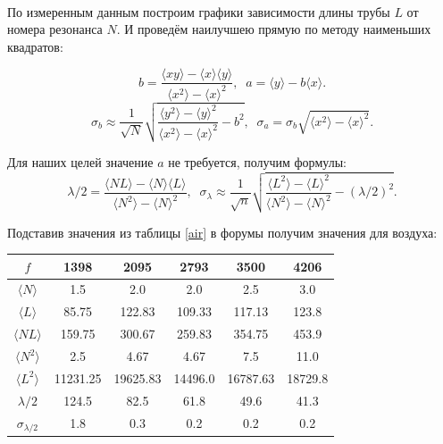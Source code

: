 \documentclass[a4paper,12pt]{article}
\begin{document}
\begin{enumerate}
\begin{enumerate}
\paragraph{} По измеренным данным построим графики зависимости длины трубы $L$ от номера резонанса $N$. И проведём наилучшею прямую по методу наименьших квадратов:

\begin{equation}
b = \frac{\langle xy \rangle - \langle x \rangle \langle y \rangle}{\langle x^2 \rangle - \langle x \rangle ^ 2}, \;\;
a = \langle y \rangle - b \langle x \rangle . \label{lsf}
\end{equation}
\begin{equation}
\sigma_b \approx \frac{1}{\sqrt{N}}\sqrt{\frac{\langle y^2 \rangle - \langle y \rangle ^ 2}{\langle x^2 \rangle - \langle x \rangle ^ 2} - b^2}, \;\;
\sigma_a = \sigma_b \sqrt{\langle x^2 \rangle - \langle x \rangle ^ 2}. \label{lsfvar}
\end{equation}

Для наших целей значение $a$ не требуется, получим формулы:
\begin{equation}
\lambda/2 = \frac{\langle NL \rangle - \langle N \rangle \langle L \rangle}{\langle N^2 \rangle - \langle N \rangle ^ 2}, \;\;
\sigma_{\lambda} \approx \frac{1}{\sqrt{n}}\sqrt{\frac{\langle L^2 \rangle - \langle L \rangle ^ 2}{\langle N^2 \rangle - \langle N \rangle ^ 2} - \left(\lambda/2\right)^2} . \label{lsf2}
\end{equation}

Подставив значения из таблицы \ref{air} в форумы получим значения для воздуха:


\begin{center}
\begin{tabular}{|c|c|c|c|c|c|}
\hline 
$f$ & 1398 & 2095 & 2793 & 3500 & 4206 \\ 
\hline 
$\langle N \rangle$ & 1.5 & 2.0 & 2.0 & 2.5 & 3.0 \\ 
\hline 
$\langle L \rangle$ & 85.75 & 122.83 & 109.33 & 117.13 & 123.8 \\ 
\hline 
$\langle NL \rangle$ & 159.75 & 300.67 & 259.83 & 354.75 & 453.9 \\ 
\hline 
$\langle N^2 \rangle$ & 2.5 & 4.67 & 4.67 & 7.5 & 11.0 \\ 
\hline 
$\langle L^2 \rangle$ & 11231.25 & 19625.83 & 14496.0 & 16787.63 & 18729.8 \\ 
\hline 
$\lambda/2$ & 124.5 & 82.5 & 61.8 & 49.6 & 41.3 \\ 
\hline 
$\sigma_{\lambda/2}$ & 1.8 & 0.3 & 0.2 & 0.2 & 0.2 \\ 
\hline 
\end{tabular} 
\end{center}



\end{enumerate}
\end{enumerate}
\end{document}
